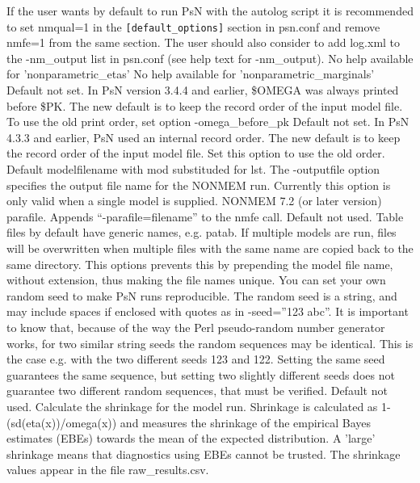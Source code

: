 \begin{optionlist}
If the user wants by default to run PsN with the autolog script it is recommended to set nmqual=1 in the
\verb|[default_options]| section in psn.conf and remove nmfe=1 from the same section. The user should also consider to add log.xml to the -nm\_output list in psn.conf (see help text for -nm\_output).
\nextopt
{}
No help available for 'nonparametric\_etas' 
\nextopt
{}
No help available for 'nonparametric\_marginals' 
\nextopt
{}
Default not set. In PsN version 3.4.4 and earlier, \$OMEGA was always printed before \$PK. The new default is to keep the record order of the input model file. To use the old print order, set option -omega\_before\_pk
\nextopt
{}
Default not set. In PsN 4.3.3 and earlier, PsN used an internal record order. The new default is to keep the record order of the input model file. Set this option to use the old order.
\nextopt
{}
Default modelfilename with mod substituded for lst. The -outputfile option specifies the output file name for the NONMEM run. Currently this option is only valid when a single model is supplied. 
\nextopt
{}
NONMEM 7.2 (or later version) parafile. Appends “-parafile=filename” to the nmfe call. 
\nextopt
{}
Default not used. Table files by default have generic names, e.g. patab. If multiple models are run, files will be overwritten when multiple files with the same name are copied back to the same directory. This options prevents this by prepending the model file name, without extension, thus making the file names unique. 
\nextopt
{}
You can set your own random seed to make PsN runs reproducible.
The random seed is a string, and may include spaces if enclosed with
quotes as in -seed=''123 abc''. It is important to know that, because of the way the Perl pseudo-random
number generator works, for two similar string seeds the random sequences may be identical. 
This is the case e.g. with the two different seeds 123 and 122. 
Setting the same seed guarantees the same sequence, but setting two slightly different 
seeds does not guarantee two different random sequences, that must be verified.
\nextopt
{}
Default not used. Calculate the shrinkage for the model run.  Shrinkage is calculated as 1-(sd(eta(x))/omega(x)) and measures the shrinkage of the empirical Bayes estimates (EBEs) towards the mean of the expected distribution.  A 'large' shrinkage means that diagnostics using EBEs cannot be trusted. The shrinkage values appear in the file raw\_results.csv. 

\end{optionlist}
